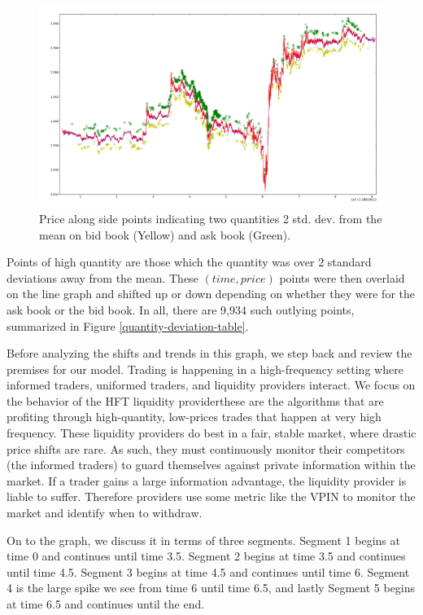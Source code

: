 \begin{figure}[ht]
  \includegraphics[width=\textwidth]{figures/20131204_quantity_deviation.png}
  \caption{Price along side points indicating two quantities 2 std. dev. from the mean on bid book (Yellow) and ask book (Green).}
  \label{quantity-deviation}
\end{figure}

Points of high quantity are those which the quantity was over 2 standard deviations away from the mean. 
These $(time, price)$ points were then overlaid on the line graph and shifted up or down depending on whether they were for the ask book or the bid book.
In all, there are 9,934 such outlying points, summarized in Figure \ref{quantity-deviation-table}.



Before analyzing the shifts and trends in this graph, we step back and review the premises for our model.
Trading is happening in a high-frequency setting where informed traders, uniformed traders, and liquidity providers interact. 
We focus on the behavior of the HFT liquidity provider\textemdash these are the algorithms that are profiting through high-quantity, low-prices trades that happen at very high frequency.
These liquidity providers do best in a fair, stable market, where drastic price shifts are rare.
As such, they must continuously monitor their competitors (the informed traders) to guard themselves against private information within the market. 
If a trader gains a large information advantage, the liquidity provider is liable to suffer.
Therefore providers use some metric like the VPIN to monitor the market and identify when to withdraw.

On to the graph, we discuss it in terms of three segments.
Segment 1 begins at time 0 and continues until time 3.5.
Segment 2 begins at time 3.5 and continues until time 4.5.
Segment 3 begins at time 4.5 and continues until time 6.
Segment 4 is the large spike we see from time 6 until time 6.5, and lastly Segment 5 begins at time 6.5 and continues until the end.

